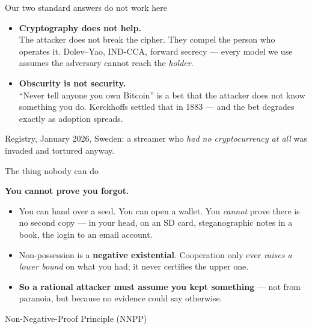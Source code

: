 \documentclass[aspectratio=169,12pt]{beamer}
\newcommand{\punch}[1]{{\color{accentdark}\bfseries #1}}
\begin{document}
\begin{frame}[t]{Our two standard answers do not work here}
  \vspace{0.50em}
  \begin{itemize}\setlength\itemsep{0.77em}
    \item \punch{Cryptography does not help.}\\
      {\small The attacker does not break the cipher. They compel the person who
       operates it. Dolev--Yao, IND-CCA, forward secrecy --- every model we use
       assumes the adversary cannot reach the \emph{holder}.}
    \item \punch{Obscurity is not security.}\\
      {\small ``Never tell anyone you own Bitcoin'' is a bet that the attacker
       does not know something you do. Kerckhoffs settled that in 1883 --- and
       the bet degrades exactly as adoption spreads.}
  \end{itemize}
  \vfill
  {\footnotesize\color{graytext}
   Registry, January 2026, Sweden: a streamer who \emph{had no cryptocurrency
   at all} was invaded and tortured anyway.}
  \vspace{0.22em}
\end{frame}

\begin{frame}[t]{The thing nobody can do}
  \vspace{0.72em}
  \begin{center}
    {\color{accentdark}\huge\bfseries You cannot prove you forgot.\par}
  \end{center}
  \vspace{0.72em}
  \begin{itemize}\setlength\itemsep{0.49em}
    \item {\small You can hand over a seed. You can open a wallet. You
      \emph{cannot} prove there is no second copy --- in your head, on an SD card,
      steganographic notes in a book, the login to an email account.}
    \item {\small Non-possession is a \textbf{negative existential}. Cooperation only
      ever \emph{raises a lower bound} on what you had; it never certifies the
      upper one.}
    \item \punch{So a rational attacker must assume you kept something} ---
      {\small not from paranoia, but because no evidence could say otherwise.}
  \end{itemize}
  \vspace{0.17em}
  {\footnotesize\color{graytext}Non-Negative-Proof Principle (NNPP)}
\end{frame}
\end{document}
